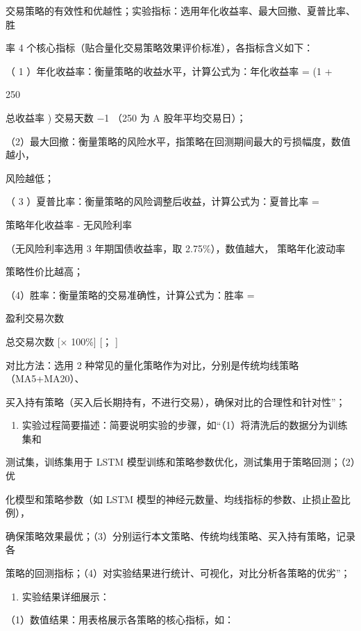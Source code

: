 \documentclass[
]{article}
\providecommand{\tightlist}{%
  \setlength{\itemsep}{0pt}\setlength{\parskip}{0pt}}
\begin{document}
交易策略的有效性和优越性；实验指标：选用年化收益率、最大回撤、夏普比率、胜

率 4 个核心指标（贴合量化交易策略效果评价标准），各指标含义如下：

（ 1 ）年化收益率：衡量策略的收益水平，计算公式为：年化收益率 = (1 +

250

总收益率 ) 交易天数 −1 （250 为 A 股年平均交易日）；

（2）最大回撤：衡量策略的风险水平，指策略在回测期间最大的亏损幅度，数值越小，

风险越低；

（ 3 ）夏普比率：衡量策略的风险调整后收益，计算公式为：夏普比率 =

策略年化收益率 - 无风险利率

（无风险利率选用 3 年期国债收益率，取 2.75\%），数值越大，
策略年化波动率

策略性价比越高；

（4）胜率：衡量策略的交易准确性，计算公式为：胜率 =

盈利交易次数

总交易次数 {[}× 100\%{]} {[}； {]}

对比方法：选用 2
种常见的量化策略作为对比，分别是传统均线策略（MA5+MA20）、

买入持有策略（买入后长期持有，不进行交易），确保对比的合理性和针对性''；

\begin{enumerate}
\def\labelenumi{\arabic{enumi}.}
\setcounter{enumi}{2}
\tightlist
\item
  实验过程简要描述：简要说明实验的步骤，如``（1）将清洗后的数据分为训练集和
\end{enumerate}

测试集，训练集用于 LSTM
模型训练和策略参数优化，测试集用于策略回测；（2）优

化模型和策略参数（如 LSTM
模型的神经元数量、均线指标的参数、止损止盈比例），

确保策略效果最优；（3）分别运行本文策略、传统均线策略、买入持有策略，记录各

策略的回测指标；（4）对实验结果进行统计、可视化，对比分析各策略的优劣''；

\begin{enumerate}
\def\labelenumi{\arabic{enumi}.}
\setcounter{enumi}{3}
\tightlist
\item
  实验结果详细展示：
\end{enumerate}

（1）数值结果：用表格展示各策略的核心指标，如：
\end{document}
